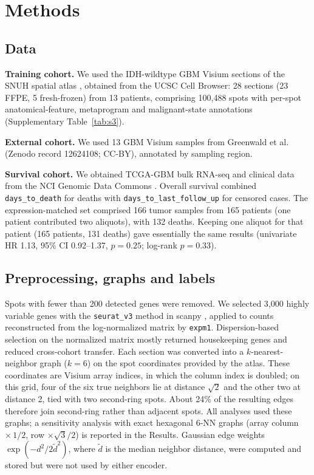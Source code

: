 \documentclass[11pt,letterpaper]{article}
\begin{document}
\section{Methods}

\subsection{Data}

\textbf{Training cohort.} We used the IDH-wildtype GBM Visium sections of the SNUH spatial atlas \cite{park2026}, obtained from the UCSC Cell Browser: 28 sections (23 FFPE, 5 fresh-frozen) from 13 patients, comprising 100{,}488 spots with per-spot anatomical-feature, metaprogram and malignant-state annotations (Supplementary Table~\ref{tab:s3}).

\textbf{External cohort.} We used 13 GBM Visium samples from Greenwald et al.\ \cite{greenwald2024} (Zenodo record 12624108; CC-BY), annotated by sampling region.

\textbf{Survival cohort.} We obtained TCGA-GBM bulk RNA-seq and clinical data from the NCI Genomic Data Commons \cite{tcga2008}. Overall survival combined \texttt{days\_to\_death} for deaths with \texttt{days\_to\_last\_follow\_up} for censored cases. The expression-matched set comprised 166 tumor samples from 165 patients (one patient contributed two aliquots), with 132 deaths. Keeping one aliquot for that patient (165 patients, 131 deaths) gave essentially the same results (univariate HR 1.13, 95\% CI 0.92--1.37, $p = 0.25$; log-rank $p = 0.33$).

\subsection{Preprocessing, graphs and labels}

Spots with fewer than 200 detected genes were removed. We selected 3{,}000 highly variable genes with the \texttt{seurat\_v3} method \cite{stuart2019} in scanpy \cite{wolf2018}, applied to counts reconstructed from the log-normalized matrix by \texttt{expm1}. Dispersion-based selection on the normalized matrix mostly returned housekeeping genes and reduced cross-cohort transfer. Each section was converted into a $k$-nearest-neighbor graph ($k = 6$) on the spot coordinates provided by the atlas. These coordinates are Visium array indices, in which the column index is doubled; on this grid, four of the six true neighbors lie at distance $\sqrt{2}$ and the other two at distance 2, tied with two second-ring spots. About 24\% of the resulting edges therefore join second-ring rather than adjacent spots. All analyses used these graphs; a sensitivity analysis with exact hexagonal 6-NN graphs (array column $\times\,1/2$, row $\times \sqrt{3}/2$) is reported in the Results. Gaussian edge weights $\exp(-d^2 / 2\tilde{d}^2)$, where $\tilde{d}$ is the median neighbor distance, were computed and stored but were not used by either encoder.
\end{document}
